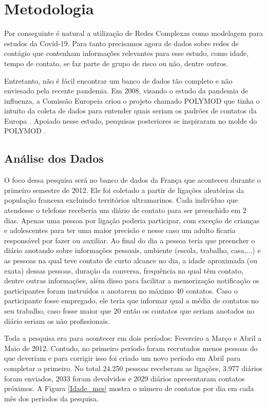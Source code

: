 \chapter{Metodologia}

Por conseguinte é natural a utilização de Redes Complexas como modelagem para estudos da Covid-19. Para tanto precisamos agora de dados sobre redes de contágio que contenham informações relevantes para esse estudo, como idade, tempo de contato, se faz parte de grupo de risco ou não, dentre outros.

Entretanto, não é fácil encontrar um banco de dados tão completo e não enviesado pela recente pandemia. Em 2008, visando o estudo da pandemia de influenza, a Comissão Europeia criou o projeto chamado POLYMOD \cite{POLYMOD} que tinha o intuito da coleta de dados para entender quais seriam os padrões de contatos da Europa \cite{Mossong2008}. Apoiado nesse estudo, pesquisas posteriores se inspiraram no molde do POLYMOD \cite{Belga2009,Belga2010,China,France,HongKong,Peru,Russia,Thailand,Vietnam,Zambia,Zimbabwe}.

\section{Análise dos Dados}

O foco dessa pesquisa será no banco de dados da França \cite{France} que aconteceu durante o primeiro semestre de 2012. Ele foi coletado a partir de ligações aleatórias da população francesa excluindo territórios ultramarinos. Cada indivíduo que atendesse o telefone receberia um diário de contato para ser preenchido em 2 dias. Apenas uma pessoa por ligação poderia participar, com exceção de crianças e adolescentes para ter uma maior precisão e nesse caso um adulto ficaria responsável por fazer ou auxiliar. Ao final do dia a pessoa teria que preencher o diário anotando sobre informações pessoais, ambiente (escola, trabalho, casa,...) e as pessoas na qual teve contato de curto alcance no dia, a idade aproximada (ou exata) dessas pessoas, duração da conversa, frequência na qual têm contato, dentre outras informações, além disso para facilitar a memorização notificação os participantes foram instruídos a anotarem no máximo 40 contatos. Caso o participante fosse empregado, ele teria que informar qual a média de contatos no seu trabalho, caso fosse maior que 20 então os contatos que seriam anotados no diário seriam os não profissionais.

Toda a pesquisa era para acontecer em dois períodos: Fevereiro a Março e Abril a Maio de 2012. Contudo, no primeiro período foram recrutados menos pessoas do que deveriam e para corrigir isso foi criado um novo período em Abril para completar o primeiro. No total 24.250 pessoas receberam as ligações, 3.977 diários foram enviados, 2033 foram devolvidos e 2029 diários apresentaram contatos próximos. A Figura \ref{Idade_mes} mostra o número de contatos por dia em cada mês dos períodos da pesquisa.

